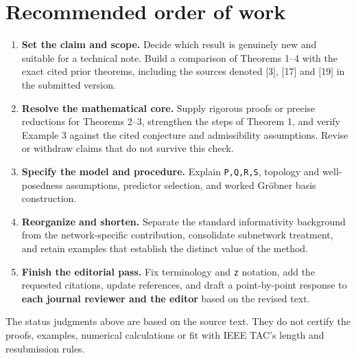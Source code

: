 \documentclass[11pt,a4paper]{article}
\begin{document}
\section{Recommended order of work}
\begin{enumerate}
\item \textbf{Set the claim and scope.} Decide which result is genuinely new and suitable for a technical note. Build a comparison of Theorems 1–4 with the exact cited prior theorems, including the sources denoted [3], [17] and [19] in the submitted version.
\item \textbf{Resolve the mathematical core.} Supply rigorous proofs or precise reductions for Theorems 2–3, strengthen the steps of Theorem 1, and verify Example 3 against the cited conjecture and admissibility assumptions. Revise or withdraw claims that do not survive this check.
\item \textbf{Specify the model and procedure.} Explain \texttt{P,Q,R,S}, topology and well-posedness assumptions, predictor selection, and worked Gröbner basis construction.
\item \textbf{Reorganize and shorten.} Separate the standard informativity background from the network-specific contribution, consolidate subnetwork treatment, and retain examples that establish the distinct value of the method.
\item \textbf{Finish the editorial pass.} Fix terminology and \texttt{z} notation, add the requested citations, update references, and draft a point-by-point response to \textbf{each journal reviewer and the editor} based on the revised text.
\end{enumerate}
The status judgments above are based on the source text. They do not certify the proofs, examples, numerical calculations or fit with IEEE TAC's length and resubmission rules.
\end{document}
